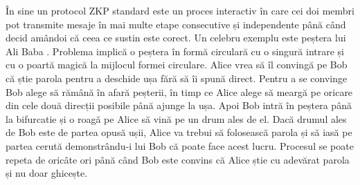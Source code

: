 În sine un protocol ZKP standard este un proces interactiv în care cei doi membri pot transmite mesaje în mai multe etape consecutive și independente până când decid amândoi că ceea ce sustin este corect. Un celebru exemplu este peștera lui Ali Baba \cite{ZKS_AliBaba}. Problema implică o peștera în formă circulară cu o singură intrare și cu o poartă magică la mijlocul formei circulare. Alice vrea să îl convingă pe Bob că știe parola pentru a deschide ușa fără să îi spună direct. Pentru a se convinge Bob alege să rămână în afară peșterii, în timp ce Alice alege să meargă pe oricare din cele două direcții posibile până ajunge la ușa. Apoi Bob intră în peștera până la bifurcatie și o roagă pe Alice să vină pe un drum ales de el. Dacă drumul ales de Bob este de partea opusă ușii, Alice va trebui să folosească parola și să iasă pe partea cerută demonstrându-i lui Bob că poate face acest lucru. Procesul se poate repeta de oricâte ori până când Bob este convins că Alice știe cu adevărat parola și nu doar ghicește. \\

